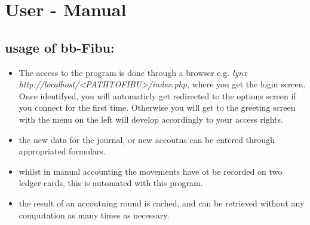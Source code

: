 \chapter{User - Manual}

\section{usage of bb-Fibu: }

\begin{itemize}

\item The access to the program is done through a browser e.g. {\em lynx
  http://localhost/<PATHTOFIBU>/index.php}, where you get the login screen. Once identifyed, you will automaticly get redirected to the options screen if you connect for the first time. Otherwise you will get to the greeting screen with the menu on the left will develop accordingly to your access rights.


\item the new data for the journal, or new accoutns can be entered through appropriated formulars.

\item whilst in manual accounting the movements have ot be recorded on two ledger cards, this is automated with this program.

\item the result of an accoutning round is cached, and can be retrieved without any computation as many times as necessary.

\end{itemize}

